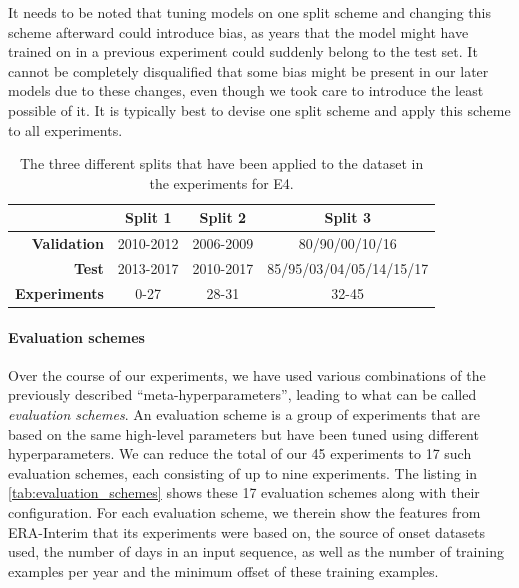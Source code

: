 It needs to be noted that tuning models on one split scheme and changing this scheme afterward could introduce bias, as years that the model might have trained on in a previous experiment could suddenly belong to the test set. It cannot be completely disqualified that some bias might be present in our later models due to these changes, even though we took care to introduce the least possible of it. It is typically best to devise one split scheme and apply this scheme to all experiments.

\begin{table}[h]
  \centering
  \begin{tabular}{rccc}
    \toprule
    & \textbf{Split 1} & \textbf{Split 2} & \textbf{Split 3} \\
    \midrule
    \textbf{Validation} & 2010-2012 & 2006-2009 & 80/90/00/10/16 \\
    \textbf{Test} & 2013-2017 & 2010-2017 & 85/95/03/04/05/14/15/17 \\
    \midrule
    \textbf{Experiments} & 0-27 & 28-31 & 32-45 \\
    \bottomrule
  \end{tabular}
  \caption{The three different splits that have been applied to the dataset in the experiments for E4.}
  \label{tab:train_test_split}
\end{table}

\paragraph{Evaluation schemes}
Over the course of our experiments, we have used various combinations of the previously described ``meta-hyperparameters'', leading to what can be called \textit{evaluation schemes}. An evaluation scheme is a group of experiments that are based on the same high-level parameters but have been tuned using different hyperparameters. We can reduce the total of our 45 experiments to 17 such evaluation schemes, each consisting of up to nine experiments. The listing in \cref{tab:evaluation_schemes} shows these 17 evaluation schemes along with their configuration. For each evaluation scheme, we therein show the features from ERA-Interim that its experiments were based on, the source of onset datasets used, the number of days in an input sequence, as well as the number of training examples per year and the minimum offset of these training examples.

